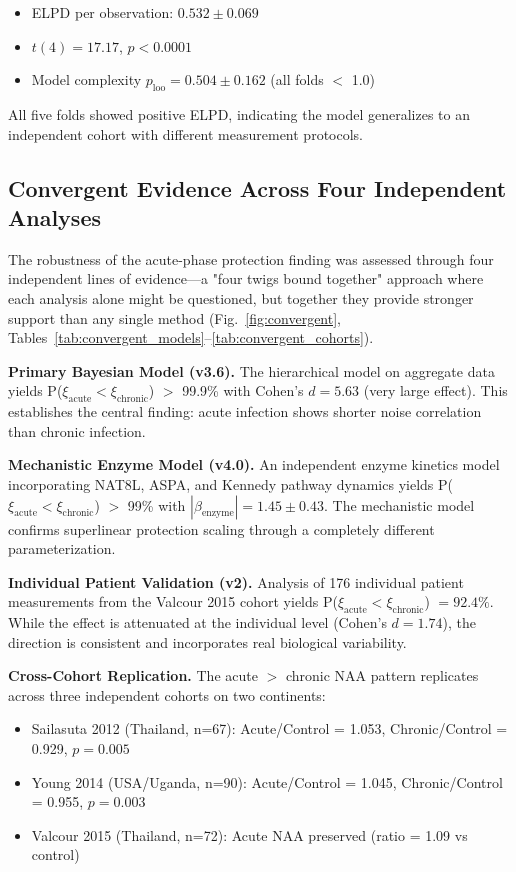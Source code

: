 \documentclass[10pt,a4paper]{article}
\begin{document}
\begin{itemize}
\item ELPD per observation: $0.532 \pm 0.069$
\item $t(4) = 17.17$, $p < 0.0001$
\item Model complexity $p_{\text{loo}} = 0.504 \pm 0.162$ (all folds $<$ 1.0)
\end{itemize}

All five folds showed positive ELPD, indicating the model generalizes to an independent cohort with different measurement protocols.

\subsection{Convergent Evidence Across Four Independent Analyses}

The robustness of the acute-phase protection finding was assessed through four independent lines of evidence---a "four twigs bound together" approach where each analysis alone might be questioned, but together they provide stronger support than any single method (Fig.~\ref{fig:convergent}, Tables~\ref{tab:convergent_models}--\ref{tab:convergent_cohorts}).

\textbf{Primary Bayesian Model (v3.6).} The hierarchical model on aggregate data yields P($\xi_{\text{acute}} < \xi_{\text{chronic}}$) $>$ 99.9\% with Cohen's $d = 5.63$ (very large effect). This establishes the central finding: acute infection shows shorter noise correlation than chronic infection.

\textbf{Mechanistic Enzyme Model (v4.0).} An independent enzyme kinetics model incorporating NAT8L, ASPA, and Kennedy pathway dynamics yields P($\xi_{\text{acute}} < \xi_{\text{chronic}}$) $>$ 99\% with $|\beta_{\text{enzyme}}| = 1.45 \pm 0.43$. The mechanistic model confirms superlinear protection scaling through a completely different parameterization.

\textbf{Individual Patient Validation (v2).} Analysis of 176 individual patient measurements from the Valcour 2015 cohort yields P($\xi_{\text{acute}} < \xi_{\text{chronic}}$) $= 92.4\%$. While the effect is attenuated at the individual level (Cohen's $d = 1.74$), the direction is consistent and incorporates real biological variability.

\textbf{Cross-Cohort Replication.} The acute $>$ chronic NAA pattern replicates across three independent cohorts on two continents:
\begin{itemize}
\item Sailasuta 2012 (Thailand, n=67): Acute/Control = 1.053, Chronic/Control = 0.929, $p = 0.005$
\item Young 2014 (USA/Uganda, n=90): Acute/Control = 1.045, Chronic/Control = 0.955, $p = 0.003$
\item Valcour 2015 (Thailand, n=72): Acute NAA preserved (ratio = 1.09 vs control)
\end{itemize}
\end{document}
